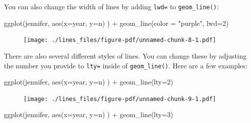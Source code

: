 \documentclass[
  letterpaper,
  DIV=11,
  numbers=noendperiod]{scrreprt}
\newenvironment{Shaded}{\begin{snugshade}}{\end{snugshade}}
\newcommand{\AttributeTok}[1]{\textcolor[rgb]{0.40,0.45,0.13}{#1}}
\newcommand{\DecValTok}[1]{\textcolor[rgb]{0.68,0.00,0.00}{#1}}
\newcommand{\FunctionTok}[1]{\textcolor[rgb]{0.28,0.35,0.67}{#1}}
\newcommand{\NormalTok}[1]{\textcolor[rgb]{0.00,0.23,0.31}{#1}}
\newcommand{\SpecialCharTok}[1]{\textcolor[rgb]{0.37,0.37,0.37}{#1}}
\newcommand{\StringTok}[1]{\textcolor[rgb]{0.13,0.47,0.30}{#1}}
\begin{document}
You can also change the width of lines by adding \texttt{lwd=} to
\texttt{geom\_line()}:

\begin{Shaded}
\begin{Highlighting}[]
\FunctionTok{ggplot}\NormalTok{(jennifer, }\FunctionTok{aes}\NormalTok{(}\AttributeTok{x=}\NormalTok{year, }\AttributeTok{y=}\NormalTok{n) ) }\SpecialCharTok{+} 
  \FunctionTok{geom\_line}\NormalTok{(}\AttributeTok{color =} \StringTok{"purple"}\NormalTok{, }\AttributeTok{lwd=}\DecValTok{2}\NormalTok{)}
\end{Highlighting}
\end{Shaded}

\begin{figure}[H]

{\centering \texttt{[image: ./lines\_files/figure-pdf/unnamed-chunk-8-1.pdf]}

}

\end{figure}

There are also several different styles of lines. You can change these
by adjusting the number you provide to \texttt{lty=} inside of
\texttt{geom\_line()}. Here are a few examples:

\begin{Shaded}
\begin{Highlighting}[]
\FunctionTok{ggplot}\NormalTok{(jennifer, }\FunctionTok{aes}\NormalTok{(}\AttributeTok{x=}\NormalTok{year, }\AttributeTok{y=}\NormalTok{n) ) }\SpecialCharTok{+} \FunctionTok{geom\_line}\NormalTok{(}\AttributeTok{lty=}\DecValTok{2}\NormalTok{)}
\end{Highlighting}
\end{Shaded}

\begin{figure}[H]

{\centering \texttt{[image: ./lines\_files/figure-pdf/unnamed-chunk-9-1.pdf]}

}

\end{figure}

\begin{Shaded}
\begin{Highlighting}[]
\FunctionTok{ggplot}\NormalTok{(jennifer, }\FunctionTok{aes}\NormalTok{(}\AttributeTok{x=}\NormalTok{year, }\AttributeTok{y=}\NormalTok{n) ) }\SpecialCharTok{+} \FunctionTok{geom\_line}\NormalTok{(}\AttributeTok{lty=}\DecValTok{3}\NormalTok{)}
\end{Highlighting}
\end{Shaded}
\end{document}
